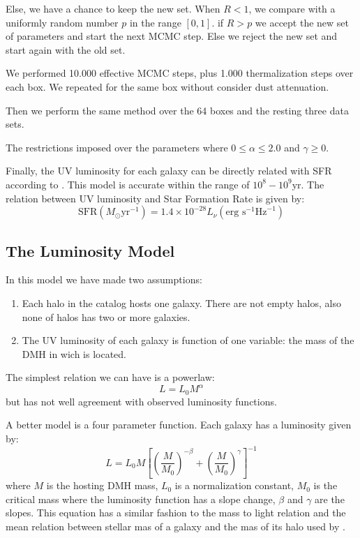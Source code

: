 \documentclass{emulateapj}
\begin{document}
Else, we have a chance to keep the new set. When $ R < 1$, we compare with a uniformly 
random number $p$ in the range $[0,1]$. if $ R>p$ we accept the new set of parameters and start
the next MCMC step. 
Else we reject the new set and start again with the old set.

We performed 10.000 effective MCMC steps, plus 1.000 thermalization steps over each box.
We repeated for the same box without consider dust attenuation.

Then we perform the same method over the 64 boxes and the resting three data sets.

The restrictions imposed over the parameters where $0 \leq \alpha \leq 2.0 $  and 
$\gamma \geq 0$.


Finally, the UV luminosity for each galaxy can be directly related with SFR according 
to \citet{madau98}.
This model is accurate within the range of $10^8 - 10^9 \textrm{yr}$\citep{kennicutt98}.
The relation between UV luminosity and Star Formation Rate \citep{madau98,kennicutt98} 
is given by:
\begin{equation}
 \textrm{SFR}\left(M_\odot \textrm{yr}^{-1}\right) 
      = 1.4 \times 10^{-28} L_{\nu} \left( \textrm{erg s}^{-1}\textrm{Hz}^{-1} 
	\right)
\end{equation}

\subsection{The Luminosity Model}

In this model we have made two assumptions:
\begin{enumerate}
 \item Each halo in the catalog hosts one galaxy. There are not empty
halos, also none of halos has two or more galaxies.
 \item The UV luminosity of each galaxy is function of one variable: the mass of
the DMH in wich is located.
\end{enumerate}

The simplest relation we can have is a powerlaw:
 \begin{equation}
  L = L_0 M^\alpha
 \end{equation}
but has not well agreement with observed luminosity functions.

A better model is a four parameter function. Each galaxy has a luminosity given
by:
  \begin{equation}
  L = L_{0} M \left[ \left( \frac{M}{M_0}\right)^{-\beta} 
		   + \left( \frac{M}{M_0}\right)^{\gamma} 
               \right]^{-1}
  \end{equation}
where $M$ is the hosting DMH mass, $L_{0}$ is a normalization constant, $M_0$
is the critical mass where the luminosity function has a slope change, 
$\beta$ and $\gamma$ are the slopes. This equation has a similar fashion to the
mass to light relation \citep{vandenbosch03} and the mean relation between
stellar mas of a galaxy and the mas of its halo used by \cite{moster10}.
\end{document}
